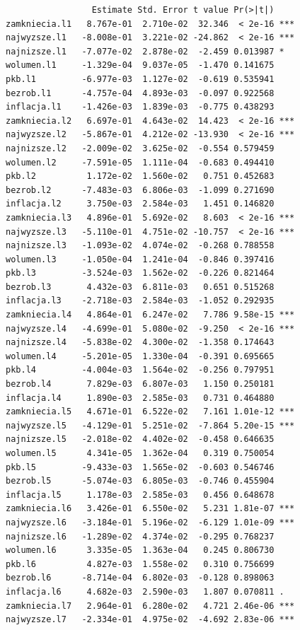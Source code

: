 \documentclass[
  polish,
  letterpaper,
  DIV=11,
  numbers=noendperiod]{scrartcl}
\begin{document}
\begin{verbatim}
                 Estimate Std. Error t value Pr(>|t|)    
zamkniecia.l1   8.767e-01  2.710e-02  32.346  < 2e-16 ***
najwyzsze.l1   -8.008e-01  3.221e-02 -24.862  < 2e-16 ***
najnizsze.l1   -7.077e-02  2.878e-02  -2.459 0.013987 *  
wolumen.l1     -1.329e-04  9.037e-05  -1.470 0.141675    
pkb.l1         -6.977e-03  1.127e-02  -0.619 0.535941    
bezrob.l1      -4.757e-04  4.893e-03  -0.097 0.922568    
inflacja.l1    -1.426e-03  1.839e-03  -0.775 0.438293    
zamkniecia.l2   6.697e-01  4.643e-02  14.423  < 2e-16 ***
najwyzsze.l2   -5.867e-01  4.212e-02 -13.930  < 2e-16 ***
najnizsze.l2   -2.009e-02  3.625e-02  -0.554 0.579459    
wolumen.l2     -7.591e-05  1.111e-04  -0.683 0.494410    
pkb.l2          1.172e-02  1.560e-02   0.751 0.452683    
bezrob.l2      -7.483e-03  6.806e-03  -1.099 0.271690    
inflacja.l2     3.750e-03  2.584e-03   1.451 0.146820    
zamkniecia.l3   4.896e-01  5.692e-02   8.603  < 2e-16 ***
najwyzsze.l3   -5.110e-01  4.751e-02 -10.757  < 2e-16 ***
najnizsze.l3   -1.093e-02  4.074e-02  -0.268 0.788558    
wolumen.l3     -1.050e-04  1.241e-04  -0.846 0.397416    
pkb.l3         -3.524e-03  1.562e-02  -0.226 0.821464    
bezrob.l3       4.432e-03  6.811e-03   0.651 0.515268    
inflacja.l3    -2.718e-03  2.584e-03  -1.052 0.292935    
zamkniecia.l4   4.864e-01  6.247e-02   7.786 9.58e-15 ***
najwyzsze.l4   -4.699e-01  5.080e-02  -9.250  < 2e-16 ***
najnizsze.l4   -5.838e-02  4.300e-02  -1.358 0.174643    
wolumen.l4     -5.201e-05  1.330e-04  -0.391 0.695665    
pkb.l4         -4.004e-03  1.564e-02  -0.256 0.797951    
bezrob.l4       7.829e-03  6.807e-03   1.150 0.250181    
inflacja.l4     1.890e-03  2.585e-03   0.731 0.464880    
zamkniecia.l5   4.671e-01  6.522e-02   7.161 1.01e-12 ***
najwyzsze.l5   -4.129e-01  5.251e-02  -7.864 5.20e-15 ***
najnizsze.l5   -2.018e-02  4.402e-02  -0.458 0.646635    
wolumen.l5      4.341e-05  1.362e-04   0.319 0.750054    
pkb.l5         -9.433e-03  1.565e-02  -0.603 0.546746    
bezrob.l5      -5.074e-03  6.805e-03  -0.746 0.455904    
inflacja.l5     1.178e-03  2.585e-03   0.456 0.648678    
zamkniecia.l6   3.426e-01  6.550e-02   5.231 1.81e-07 ***
najwyzsze.l6   -3.184e-01  5.196e-02  -6.129 1.01e-09 ***
najnizsze.l6   -1.289e-02  4.374e-02  -0.295 0.768237    
wolumen.l6      3.335e-05  1.363e-04   0.245 0.806730    
pkb.l6          4.827e-03  1.558e-02   0.310 0.756699    
bezrob.l6      -8.714e-04  6.802e-03  -0.128 0.898063    
inflacja.l6     4.682e-03  2.590e-03   1.807 0.070811 .  
zamkniecia.l7   2.964e-01  6.280e-02   4.721 2.46e-06 ***
najwyzsze.l7   -2.334e-01  4.975e-02  -4.692 2.83e-06 ***

\end{verbatim}
\end{document}

